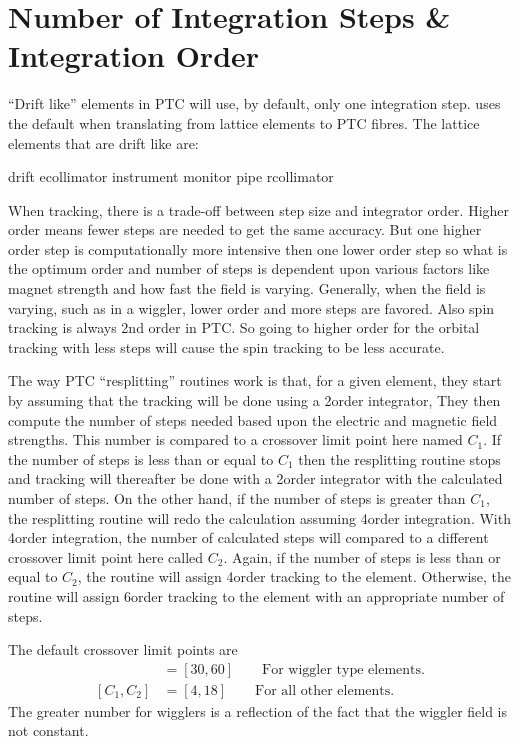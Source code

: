 {{{{{{\section{Number of Integration Steps \& Integration Order}
\label{s:ptc.step}

``Drift like'' elements in PTC will use, by default, only one
integration step. \bmad uses the default when translating from \bmad
lattice elements to PTC fibres. The \bmad lattice elements that are
drift like are:
\begin{example}
  drift
  ecollimator 
  instrument 
  monitor 
  pipe
  rcollimator 
\end{example}

When tracking, there is a trade-off between step size and integrator order. Higher order
means fewer steps are needed to get the same accuracy. But one higher order step is
computationally more intensive then one lower order step so what is the optimum order and
number of steps is dependent upon various factors like magnet strength and how fast the
field is varying. Generally, when the field is varying, such as in a wiggler, lower order
and more steps are favored. Also spin tracking is always 2nd order in PTC. So going to higher
order for the orbital tracking with less steps will cause the spin tracking to be less
accurate.

The way PTC ``resplitting'' routines work is that, for a given element, they start by
assuming that the tracking will be done using a 2\Nd order integrator, They then compute
the number of steps needed based upon the electric and magnetic field strengths. This
number is compared to a crossover limit point here named $C_1$. If the number of steps is
less than or equal to $C_1$ then the resplitting routine stops and tracking will
thereafter be done with a 2\Nd order integrator with the calculated number of steps. On
the other hand, if the number of steps is greater than $C_1$, the resplitting routine will
redo the calculation assuming 4\Th order integration. With 4\Th order integration, the
number of calculated steps will compared to a different crossover limit point here called
$C_2$. Again, if the number of steps is less than or equal to $C_2$, the routine will
assign 4\Th order tracking to the element. Otherwise, the routine will assign 6\Th order
tracking to the element with an appropriate number of steps.

The default crossover limit points are
\begin{align}
  [C_1, C_2] & = [30, 60] \qquad \text{For wiggler type elements.} \nonumber \\
  [C_1, C_2] & = [4, 18]  \qquad \text{For all other elements.} \nonumber 
\end{align}
The greater number for wigglers is a reflection of the fact that the wiggler field
is not constant.

}}}}}}

